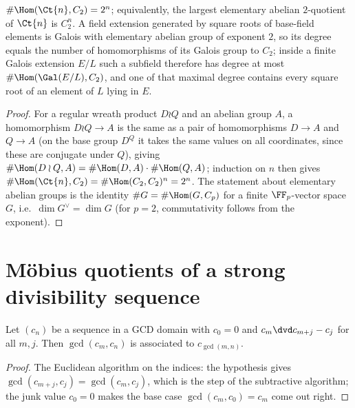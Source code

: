 \begin{lemma}
  \label{lem:wreathab}
  \leanok
  $\#\Hom(\Ct{n}, C_2) = 2^n$; equivalently, the largest elementary abelian $2$-quotient of
  $\Ct{n}$ is $C_2^n$. A field extension generated by square roots of base-field elements is
  Galois with elementary abelian group of exponent $2$, so its degree equals the number of
  homomorphisms of its Galois group to $C_2$; inside a finite Galois extension $E/L$ such a
  subfield therefore has degree at most $\#\Hom(\Gal(E/L), C_2)$, and one of that maximal degree
  contains every square root of an element of $L$ lying in $E$.
\end{lemma}
\begin{proof}
  \leanok
  For a regular wreath product $D \wr Q$ and an abelian group $A$, a homomorphism $D \wr Q \to A$
  is the same as a pair of homomorphisms $D \to A$ and $Q \to A$ (on the base group $D^Q$ it
  takes the same values on all coordinates, since these are conjugate under $Q$), giving
  $\#\Hom(D \wr Q, A) = \#\Hom(D, A) \cdot \#\Hom(Q, A)$; induction on $n$ then gives
  $\#\Hom(\Ct{n}, C_2) = \#\Hom(C_2, C_2)^n = 2^n$. The statement about elementary abelian
  groups is the identity $\#G = \#\Hom(G, C_p)$ for a finite $\FF_p$-vector space $G$, i.e.\
  $\dim G^{\vee} = \dim G$ (for $p = 2$, commutativity follows from the exponent).
\end{proof}

\section{Möbius quotients of a strong divisibility sequence}

\begin{lemma}
  \label{lem:strongdvd}
  \leanok
  Let $(c_n)$ be a sequence in a GCD domain with $c_0 = 0$ and $c_m \dvd c_{m+j} - c_j$ for all
  $m, j$. Then $\gcd(c_m, c_n)$ is associated to $c_{\gcd(m,n)}$.
\end{lemma}
\begin{proof}
  \leanok
  The Euclidean algorithm on the indices: the hypothesis gives
  $\gcd(c_{m+j}, c_j) = \gcd(c_m, c_j)$, which is the step of the subtractive algorithm; the
  junk value $c_0 = 0$ makes the base case $\gcd(c_m, c_0) = c_m$ come out right.
\end{proof}

